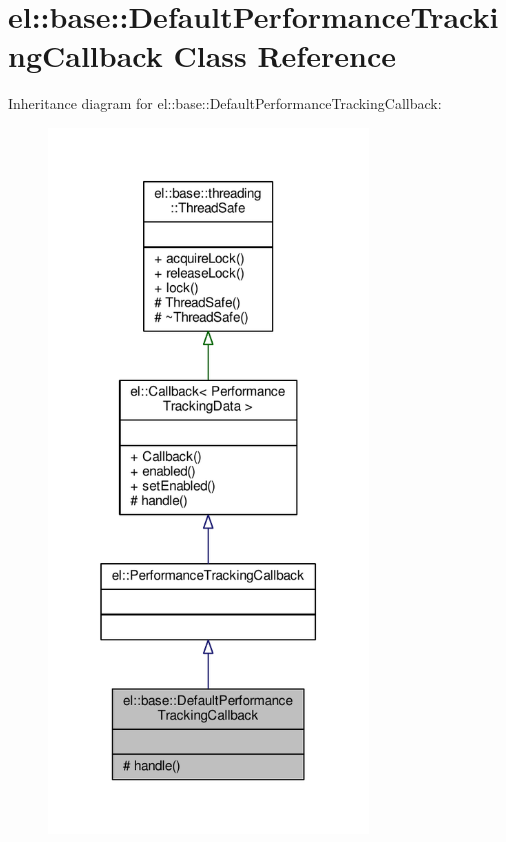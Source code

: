 \hypertarget{classel_1_1base_1_1DefaultPerformanceTrackingCallback}{}\section{el\+:\+:base\+:\+:Default\+Performance\+Tracking\+Callback Class Reference}
\label{classel_1_1base_1_1DefaultPerformanceTrackingCallback}


Inheritance diagram for el\+:\+:base\+:\+:Default\+Performance\+Tracking\+Callback\+:
\nopagebreak
\begin{figure}[H]
\begin{center}
\leavevmode
\includegraphics[width=241pt]{d6/d1e/classel_1_1base_1_1DefaultPerformanceTrackingCallback__inherit__graph}
\end{center}
\end{figure}


